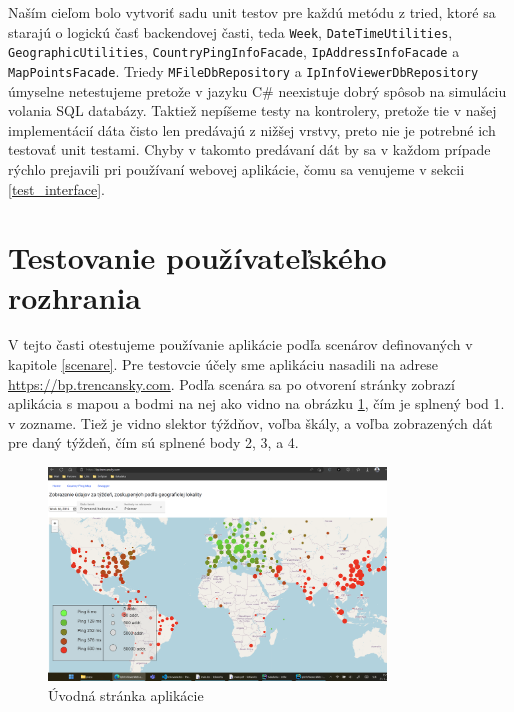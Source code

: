 Naším cieľom bolo vytvoriť sadu unit testov pre každú metódu z tried, ktoré sa starajú o logickú časť backendovej časti, teda \lstinline{Week}, 
\lstinline{DateTimeUtilities}, \lstinline{GeographicUtilities}, \lstinline{CountryPingInfoFacade}, \lstinline{IpAddressInfoFacade} a \lstinline{MapPointsFacade}.
Triedy \lstinline{MFileDbRepository} a \lstinline{IpInfoViewerDbRepository} úmyselne netestujeme pretože v jazyku C\# neexistuje dobrý spôsob na simuláciu 
volania SQL databázy. Taktiež nepíšeme testy na kontrolery, pretože tie v našej implementácií dáta čisto len predávajú z nižšej vrstvy, preto nie je potrebné 
ich testovať unit testami. Chyby v takomto predávaní dát by sa v každom prípade rýchlo prejavili pri používaní webovej aplikácie, čomu sa venujeme v sekcii 
\ref{test_interface}.

\section{Testovanie používateľského rozhrania}
V tejto časti otestujeme používanie aplikácie podľa scenárov definovaných v kapitole \ref{scenare}. Pre testovcie účely sme aplikáciu nasadili na adrese 
\href{https://bp.trencansky.com/}{https://bp.trencansky.com}. Podľa scenára sa po otvorení stránky zobrazí aplikácia s mapou a bodmi na nej ako vidno 
na obrázku \ref{obr:uvod_stranka}, čím je splnený bod 1. v zozname. Tiež je vidno slektor týždňov, voľba škály, a voľba zobrazených dát pre daný týždeň, čím sú 
splnené body 2, 3, a 4.   
\begin{figure}
    \centerline{\includegraphics[width=0.8\textwidth]{images/uvodna_stranka}}
    \caption[Úvodná stránka aplikácie]{Úvodná stránka aplikácie}
    \label{obr:uvod_stranka}
\end{figure}
\label{test_interface}

